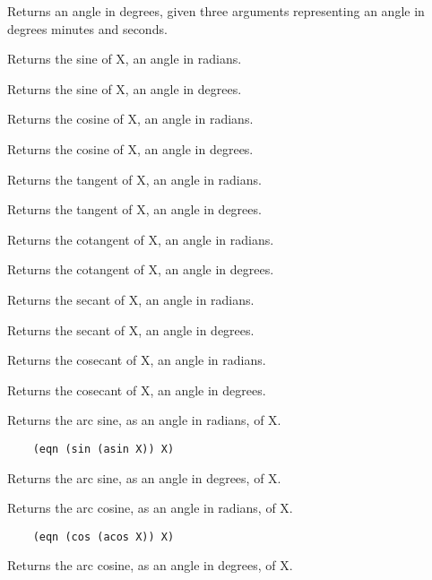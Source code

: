 {    Returns  an  angle  in  degrees,   given   three   arguments
    representing an angle in degrees minutes and seconds.  }

{    Returns the sine of X, an angle in radians.  }

{    Returns the sine of X, an angle in degrees.  }

{    Returns the cosine of X, an angle in radians.  }

{    Returns the cosine of X, an angle in degrees.  }

{    Returns the tangent of X, an angle in radians.  }

{    Returns the tangent of X, an angle in degrees.  }

{    Returns the cotangent of X, an angle in radians.  }

{    Returns the cotangent of X, an angle in degrees.  }

{    Returns the secant of X, an angle in radians.  }

{    Returns the secant of X, an angle in degrees.  }

{    Returns the cosecant of X, an angle in radians.  }

{    Returns the cosecant of X, an angle in degrees.  }

{    Returns the arc sine, as an angle in radians, of X.  }
\begin{verbatim}
    (eqn (sin (asin X)) X)
\end{verbatim}
{    Returns the arc sine, as an angle in degrees, of X.  }

{    Returns the arc cosine, as an angle in radians, of X.  }
\begin{verbatim}
    (eqn (cos (acos X)) X)
\end{verbatim}
{    Returns the arc cosine, as an angle in degrees, of X.  }


